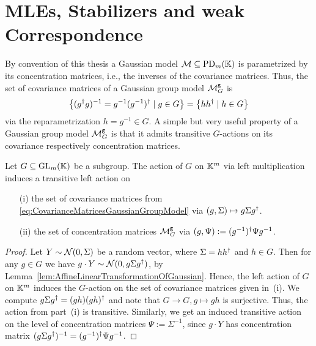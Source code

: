 
\section{MLEs, Stabilizers and weak Correspondence}\label{sec:MLEsStabilizer}


By convention of this thesis a Gaussian model $\mathcal{M} \subseteq \operatorname{PD}_m(\mathbb K)$ is parametrized by its concentration matrices, i.e., the inverses of the covariance matrices. Thus, the set of covariance matrices of a Gaussian group model $\mathcal{M}^{\mathtt{g}}_G$ is
\begin{equation}\label{eq:CovarianceMatricesGaussianGroupModel}
	\left\lbrace (g^{\dagger} g)^{-1} = g^{-1} (g^{-1})^{\dagger} \mid g \in G \right\rbrace = \big\{h h^{\dagger} \mid h \in G \big\}
\end{equation}
via the reparametrization $h = g ^{-1} \in G$. A simple but very useful property of a Gaussian group model $\mathcal{M}^{\mathtt{g}}_G$ is that it admits transitive $G$-actions on its covariance respectively concentration matrices.

\begin{prop}\label{prop:TransitiveActionOnMgG}
Let $G \subseteq \operatorname{GL}_m(\mathbb K)$ be a subgroup. The action of $G$ on $\mathbb K^m$ via left multiplication induces a transitive left action on
	\begin{itemize}
		\item[(i)] the set of covariance matrices from \eqref{eq:CovarianceMatricesGaussianGroupModel} via $(g, \Sigma) \mapsto g\Sigma g^{\dagger}$.
		
		\item[(ii)] the set of concentration matrices $\mathcal{M}^{\mathtt{g}}_G$ via $(g, \Psi) := (g^{-1})^{\dagger} \Psi g^{-1}$.
	\end{itemize}
\end{prop}

\begin{proof}
	Let $Y \sim \mathcal{N}(0, \Sigma)$ be a random vector, where $\Sigma = h h^{\dagger}$ and $h \in G$. Then for any $g \in G$ we have $g \cdot Y \sim \mathcal{N}(0, g \Sigma g^{\dagger})$, by Lemma~\ref{lem:AffineLinearTransformationOfGaussian}. Hence, the left action of $G$ on $\mathbb K^m$ induces the $G$-action on the set of covariance matrices given in~(i). We compute $g \Sigma g ^{\dagger} = (gh) (gh)^{\dagger}$ and note that $G \to G, g \mapsto gh$ is surjective. Thus, the action from part~(i) is transitive. Similarly, we get an induced transitive action on the level of concentration matrices $\Psi := \Sigma^{-1}$, since $g \cdot Y$ has concentration matrix $(g \Sigma g^{\dagger})^{-1} = (g^{-1})^{\dagger} \Psi g^{-1}$. 
\end{proof}

